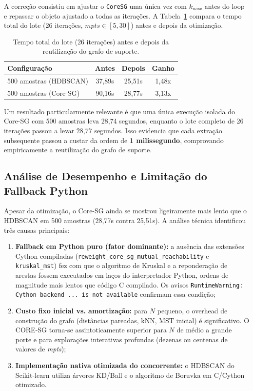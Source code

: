\documentclass[12pt,a4paper,oneside]{article}
\begin{document}
A correção consistiu em ajustar o \texttt{CoreSG} uma única vez com $k_{max}$ antes do loop e
repassar o objeto ajustado a todas as iterações. A Tabela~\ref{tab:dell_depois} compara o
tempo total do lote (26 iterações, $mpts \in [5,30]$) antes e depois da otimização.

\begin{table}[H]
  \centering
  \caption{Tempo total do lote (26 iterações) antes e depois da reutilização do grafo de
           suporte.}
  \label{tab:dell_depois}
  \begin{tabular}{lccc}
    \toprule
    \textbf{Configuração} & \textbf{Antes} & \textbf{Depois} & \textbf{Ganho} \\
    \midrule
    500 amostras (HDBSCAN) & 37,89s & 25,51s & 1,48x \\
    500 amostras (Core-SG) & 90,16s & 28,77s & 3,13x \\
    \bottomrule
  \end{tabular}
\end{table}

Um resultado particularmente relevante é que uma única execução isolada do Core-SG com 500
amostras leva 28,74 segundos, enquanto o lote completo de 26 iterações passou a levar 28,77
segundos. Isso evidencia que cada extração subsequente passou a custar da ordem de
\textbf{1 milissegundo}, comprovando empiricamente a reutilização do grafo de suporte.

\subsection{Análise de Desempenho e Limitação do Fallback Python}

Apesar da otimização, o Core-SG ainda se mostrou ligeiramente mais lento que o HDBSCAN em 500
amostras (28,77s contra 25,51s). A análise técnica identificou três causas principais:

\begin{enumerate}
  \item \textbf{Fallback em Python puro (fator dominante):} a ausência das extensões Cython
        compiladas (\texttt{reweight\_core\_sg\_mutual\_reachability} e \texttt{kruskal\_mst})
        fez com que o algoritmo de Kruskal e a reponderação de arestas fossem executados em
        laços do interpretador Python, ordens de magnitude mais lentos que código C compilado.
        Os avisos \texttt{RuntimeWarning: Cython backend ... is not available} confirmam essa
        condição;
  \item \textbf{Custo fixo inicial vs. amortização:} para $N$ pequeno, o overhead de construção
        do grafo (distâncias pareadas, kNN, MST inicial) é significativo. O CORE-SG torna-se
        assintoticamente superior para $N$ de médio a grande porte e para explorações
        interativas profundas (dezenas ou centenas de valores de \textit{mpts});
  \item \textbf{Implementação nativa otimizada do concorrente:} o HDBSCAN do Scikit-learn
        utiliza árvores KD/Ball e o algoritmo de Boruvka em C/Cython otimizado.
\end{enumerate}
\end{document}
